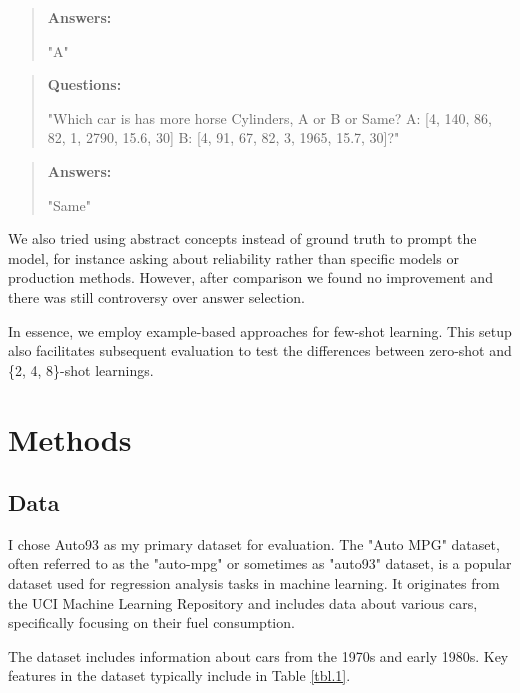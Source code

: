 \documentclass{ieeeaccess}
\newenvironment{Questions}{
    \begin{quote}
    \textbf{Questions:}
}{\end{quote}}
\newenvironment{Answers}{
    \begin{quote}
    \textbf{Answers:}
}{\end{quote}}
\begin{document}
\begin{Answers}
    "A"
\end{Answers}
\begin{Questions}
    "Which car is has more horse Cylinders, A or B or Same? A: [4, 140, 86, 82, 1, 2790, 15.6, 30] B: [4, 91, 67, 82, 3, 1965, 15.7, 30]?"
\end{Questions}

\begin{Answers}
    "Same"
\end{Answers}

We also tried using abstract concepts instead of ground truth to prompt the model, for instance asking about reliability rather than specific models or production methods. However, after comparison we found no improvement and there was still controversy over answer selection.

In essence, we employ example-based approaches for few-shot learning. This setup also facilitates subsequent evaluation to test the differences between zero-shot and \{2, 4, 8\}-shot learnings.

\section{Methods}
\label{sec:methods}
\subsection{Data}
I chose Auto93 as my primary dataset for evaluation. The "Auto MPG" dataset, often referred to as the "auto-mpg" or sometimes as "auto93" dataset, is a popular dataset used for regression analysis tasks in machine learning. It originates from the UCI Machine Learning Repository and includes data about various cars, specifically focusing on their fuel consumption\cite{auto_mpg_1993}.

The dataset includes information about cars from the 1970s and early 1980s. Key features in the dataset typically include in Table \ref{tbl.1}.
\end{document}
